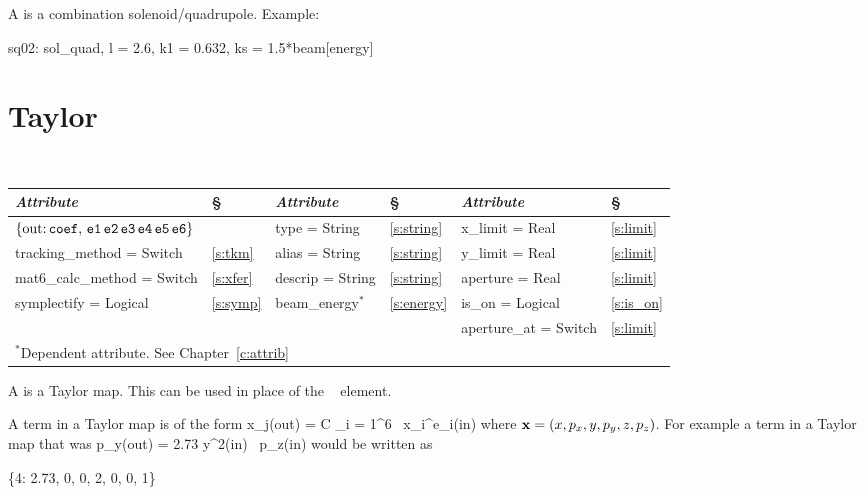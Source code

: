 {{A  is a combination solenoid/quadrupole.
Example:
\begin{example}
  sq02: sol_quad, l = 2.6, k1 = 0.632, ks = 1.5*beam[energy]
\end{example}

\section{Taylor}
\label{s:tay}

\begin{center}
\tt
\begin{tabular}{|l|l||l|l||l|l|} \hline
  {\sl Attribute} & \S  & {\sl Attribute} & \S & {\sl Attribute} & \S \\ \hline
  $\{ \tt \mbox{out:}\,  coef, \, e1 \, e2 \, e3 \, e4 \, e5 \, e6 \}$ 
                              &              & type = String    & \ref{s:string} & x\_limit = Real       & \ref{s:limit} \\ \hline  
  tracking\_method = Switch   & \ref{s:tkm}  & alias = String   & \ref{s:string} & y\_limit = Real       & \ref{s:limit} \\ \hline
  mat6\_calc\_method = Switch & \ref{s:xfer} & descrip = String & \ref{s:string} & aperture = Real       & \ref{s:limit} \\ \hline
  symplectify = Logical       & \ref{s:symp} & beam\_energy$^*$ & \ref{s:energy} & is\_on = Logical      & \ref{s:is_on} \\ \hline
                              &              &                  &                & aperture\_at = Switch & \ref{s:limit} \\ \hline
  \multicolumn{6}{l}{\small $^*$Dependent attribute. See Chapter~\ref{c:attrib}} \\
\end{tabular}
\end{center}
\toffset

A  is a Taylor map. This can be used in place of the \mad\ 
 element.

A term in a Taylor map is of the form
\Begineq
  x_j({\rm out}) = C \cdot \Pi_{i = 1}^6 \, x_i^{e_i}({\rm in})
\Endeq
where ${\bf x} = (x, p_x, y, p_y, z, p_z)$. For example a term
in a Taylor map that was
\Begineq
  p_y({\rm out}) = 2.73 \cdot y^2({\rm in}) \, p_z({\rm in})
\Endeq
would be written as
\begin{example}
  \{4: 2.73, 0, 0, 2, 0, 0, 1\}
\end{example}

}}
